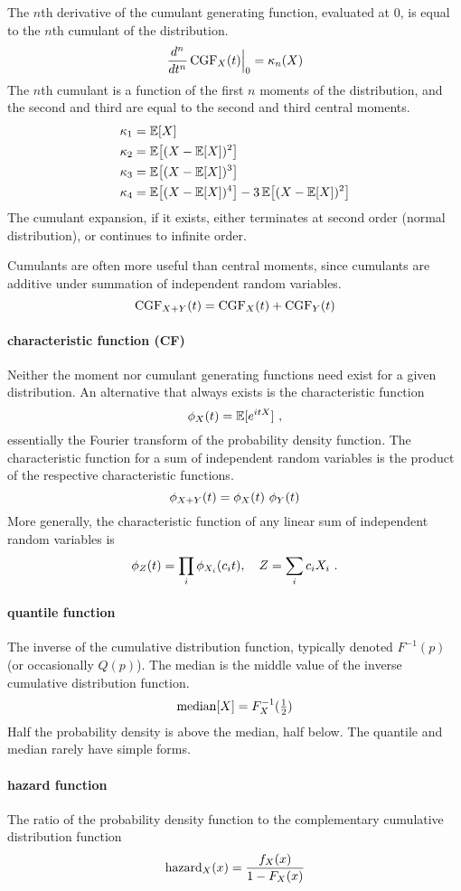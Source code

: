 The $n$th derivative of the cumulant generating function, evaluated at $0$, is equal to the $n$th cumulant of the distribution. 
\[
\frac{d^n}{dt^n}\operatorname{CGF}_X(t)\Big|_0 = \kappa_n(X)  
\]
The $n$th cumulant is a function of the first $n$ moments of the distribution, and the second and third are equal to the second and third central moments.
\begin{align*}
\kappa_1 &= \expect[X] \checked \\
\kappa_2 &= \expect\Left[ (X-\expect[X])^2 \Right] \checked\\
\kappa_3 &= \expect\Left[ (X-\expect[X])^3 \Right] \checked \\
\kappa_4 &= \expect\Left[ (X-\expect[X])^4 \Right] - 3 \expect\Left[ (X-\expect[X])^2 \Right] \checked
\end{align*}
The cumulant expansion, if it exists, either terminates at second order (normal distribution), or continues to infinite order.

Cumulants are often more useful than central moments, since cumulants are additive under summation of independent random variables. 
\[
\op{CGF}_{X+Y}(t) = \op{CGF}_{X}(t) + \op{CGF}_{Y}(t) 
\checked
\notag
\]


\paragraph*{characteristic function (CF)} 
\label{characteristic_function}
Neither the moment nor cumulant generating functions need exist for a given distribution. An alternative that always exists is the characteristic function
\[
\phi_X(t) = \operatorname{\mathbb E}[e^{i t X}]  \ , 
\notag
\]
essentially the Fourier transform of the probability density function. The characteristic function for a  sum of independent random variables is the product of the respective characteristic functions. 
\[
\phi_{ X+ Y}(t) = \phi_{X}( t)\  \phi_{Y}(t) 
\checked
\notag
\]
More generally, the characteristic function of any linear sum of independent random variables is
\[
\phi_{Z}(t) = \prod_i \phi_{X_i}(c_i t), \quad Z = \sum_i c_i X_i \ .
\checked
\notag
\]


\paragraph*{quantile function} 
The inverse of the cumulative distribution function, typically denoted  $F^{-1}(p)$ (or occasionally
 $Q(p)$).
 The median is the middle value of the inverse cumulative distribution function. 
\[
\operatorname{median}[X] = F_X^{-1}(\tfrac{1}{2}) 
\notag
\]
Half the probability density is above the median, half below. 
The quantile and median rarely have simple forms.


\paragraph*{hazard function}
The ratio of the probability density function to the complementary cumulative distribution function
\[
\operatorname{hazard}_X(x) = \frac{f_X(x)}{1-F_X(x)} 
\notag
\]


